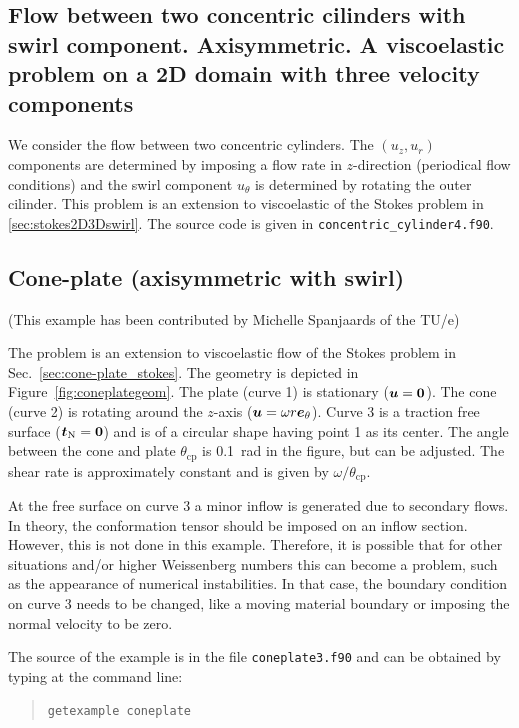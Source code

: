 \subsection{Flow between two concentric cilinders with swirl component. Axisymmetric. A viscoelastic problem on a 2D domain with three velocity components}            
\label{sec:viscoelastic2D3Dswirlimpl}

We consider the flow between two concentric cylinders. The $(u_z,u_r)$ components
 are determined by imposing a flow rate in $z$-direction (periodical flow conditions) and the swirl component $u_\theta$ is determined by rotating the outer cilinder. 
This problem is an extension to viscoelastic of the Stokes problem in \ref{sec:stokes2D3Dswirl}.
The source code is given in \texttt{concentric\_cylinder4.f90}.

\subsection{Cone-plate (axisymmetric with swirl)}
\label{sec:cone-plate_ve_si}

(This example has been contributed by Michelle Spanjaards of the TU/e)

The problem is an extension to viscoelastic flow of the Stokes problem in Sec.~\ref{sec:cone-plate_stokes}.
The geometry is depicted in Figure~\ref{fig:coneplategeom}. The plate (curve 1) is stationary ($\boldsymbol{u}=\boldsymbol{0}$). The cone (curve 2) is rotating around the $z$-axis ($\boldsymbol{u}=\omega r \boldsymbol{e}_\theta$). Curve 3 is a traction free surface ($\boldsymbol{t}_\text{N}=\boldsymbol{0}$) and is of a circular shape having point 1 as its center. The angle between the cone and plate $\theta_\text{cp}$ is 0.1~rad in the figure, but can be adjusted. The shear rate is approximately constant and is given by $\omega/\theta_\text{cp}$. 

At the free surface on curve 3 a minor inflow is generated due to secondary flows. In theory, the conformation tensor should be imposed on an inflow section. However, this is not done in this example. Therefore, it is possible that for other situations and/or higher Weissenberg numbers this can become a problem, such as the appearance of numerical instabilities. In that case, the boundary condition on curve 3 needs to be changed, like a moving material boundary or imposing the normal velocity to be zero.

The source of the example is in the file \texttt{coneplate3.f90}
and can be obtained by typing at the
command line:
\begin{quote}
   \texttt{getexample coneplate}
\end{quote}




